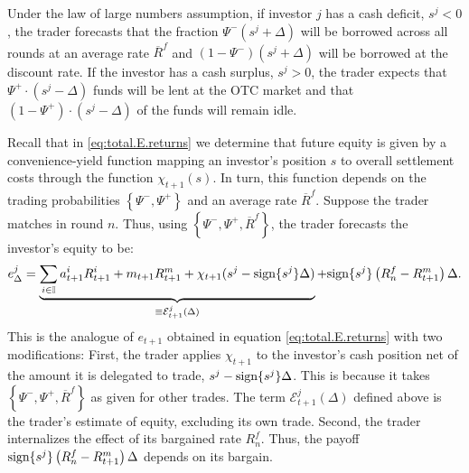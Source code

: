 \documentclass[12pt,american,english,notitlepage]{article}
\begin{document}
Under the law of large numbers assumption, if investor $j$ has a cash deficit, $s^{j}<0$, the trader forecasts that the fraction $\Psi^{-}\left(s^{j}+\Delta\right)$
will be borrowed across all rounds at an average rate $\overline{R}^{f}$
and $\left(1-\Psi^{-}\right)\left(s^{j}+\Delta\right)$ will be borrowed at the discount rate. If the investor has a cash surplus, $s^{j}>0$, the trader expects that $\Psi^{+}\cdot\left(s^{j}-\Delta\right)$ funds will be lent at the OTC market and that $\left(1-\Psi^{+}\right)\cdot\left(s^{j}-\Delta\right)$
of the funds will remain idle.

Recall that in \eqref{eq:total.E.returns} we determine that future equity is given by a convenience-yield function mapping an investor's position $s$ to overall settlement costs through the function $\chi_{t+1}(s).$ In turn, this function depends on the trading probabilities $\left\{ \Psi^{-},\Psi^{+}\right\} $ and an average rate $\overline{R}^{f}$. Suppose the trader matches in round $n$. Thus, using $\left\{ \Psi^{-},\Psi^{+},\overline{R}^{f}\right\}$,
the trader forecasts the investor's equity to be:
\[
e_{\Delta}^{j}=\underbrace{\sum_{i\in\mathbb{I}}a_{t+1}^{i}R_{t+1}^{i}+m_{t+1}R_{t+1}^{m}+\chi_{t+1}(s^{j}-\text{sign}\{s^{j}\}\Delta)}_{\equiv \mathcal{E}_{t+1}^{j}(\Delta)}+\text{sign}\{s^{j}\}\left(R_{n}^{f}-R_{t+1}^{m}\right)\Delta.
\]
This is the analogue of $e_{t+1}$ obtained in equation \eqref{eq:total.E.returns}
with two modifications: First, the trader{
applies $\chi_{t+1}$ to the investor's cash position net of the amount
it is delegated to trade, $s^{j}-\text{sign}\{s^{j}\}\Delta$. This is because
it takes $\left\{ \Psi^{-},\Psi^{+},\overline{R}^{f} \right\} $
as given for other trades. The term $\mathcal{E}_{t+1}^{j}(\Delta)$
defined above is the trader's estimate of equity, excluding its own
trade. Second, the trader internalizes the effect of its bargained
rate $R_{n}^{f}$. Thus, the payoff $\text{sign}\{s^{j}\}\left(R_{n}^{f}-R_{t+1}^{m}\right)\Delta$
depends on its bargain. }
\end{document}
